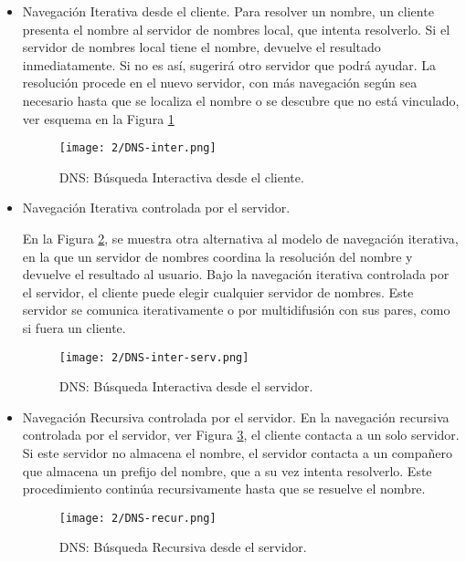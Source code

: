 \begin{itemize}
	\item Navegación Iterativa desde el cliente.
	Para resolver un nombre, un cliente presenta el nombre al servidor de nombres local, que intenta resolverlo. Si el servidor de nombres local tiene el nombre, devuelve el resultado inmediatamente. Si no es así, sugerirá otro servidor que podrá ayudar. La resolución procede en el nuevo servidor, con más navegación según sea necesario hasta que se localiza el nombre o se descubre que no está vinculado, ver esquema en la Figura \ref{fig:DNS-inter}
	
	
	\begin{figure}  
		\begin{center}									
		\texttt{[image: 2/DNS-inter.png]}		
		\caption{DNS: Búsqueda Interactiva desde el cliente. }
		\label{fig:DNS-inter} 		
	 \end{center} 
 \end{figure} 
	
	\item Navegación Iterativa controlada por el servidor.
	
	En la Figura \ref{fig:DNS-inter-serv}, se muestra otra alternativa al modelo de navegación iterativa, en la que un servidor de nombres coordina la resolución del nombre y devuelve el resultado al  usuario.  Bajo la navegación iterativa controlada por el servidor,  el cliente puede elegir cualquier servidor de nombres. Este servidor se comunica iterativamente o por multidifusión con sus pares, como si fuera un cliente.
	\begin{figure}  
		\begin{center}									
		\texttt{[image: 2/DNS-inter-serv.png]}		
		\caption{DNS: Búsqueda Interactiva desde el servidor. }
		\label{fig:DNS-inter-serv} 		
	 \end{center} 
 \end{figure} 
		
	\item Navegación Recursiva controlada por el servidor.
	  En la navegación recursiva controlada por el servidor, ver Figura \ref{fig:DNS-recur}, el cliente  contacta a un solo servidor. Si este servidor no almacena el nombre, el servidor contacta a un compañero que almacena un prefijo  del nombre, que a su vez intenta resolverlo. Este procedimiento continúa recursivamente hasta que se resuelve el nombre.
	
		\begin{figure}  
			\begin{center}									
		\texttt{[image: 2/DNS-recur.png]}		
		\caption{DNS: Búsqueda Recursiva desde el servidor. }
		\label{fig:DNS-recur} 		
	 \end{center} 
 \end{figure} 
\end{itemize}



